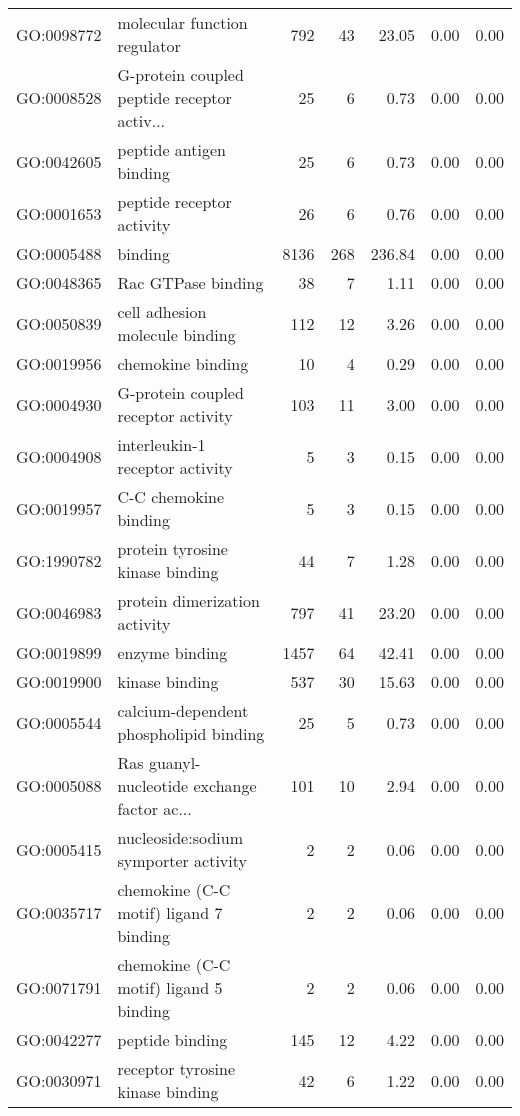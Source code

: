 \begin{table}[ht]
\begin{tabular}{llrrrrr}
  GO:0098772 & molecular function regulator & 792 &  43 & 23.05 & 0.00 & 0.00 \\ 
  GO:0008528 & G-protein coupled peptide receptor activ... &  25 &   6 & 0.73 & 0.00 & 0.00 \\ 
  GO:0042605 & peptide antigen binding &  25 &   6 & 0.73 & 0.00 & 0.00 \\ 
  GO:0001653 & peptide receptor activity &  26 &   6 & 0.76 & 0.00 & 0.00 \\ 
  GO:0005488 & binding & 8136 & 268 & 236.84 & 0.00 & 0.00 \\ 
  GO:0048365 & Rac GTPase binding &  38 &   7 & 1.11 & 0.00 & 0.00 \\ 
  GO:0050839 & cell adhesion molecule binding & 112 &  12 & 3.26 & 0.00 & 0.00 \\ 
  GO:0019956 & chemokine binding &  10 &   4 & 0.29 & 0.00 & 0.00 \\ 
  GO:0004930 & G-protein coupled receptor activity & 103 &  11 & 3.00 & 0.00 & 0.00 \\ 
  GO:0004908 & interleukin-1 receptor activity &   5 &   3 & 0.15 & 0.00 & 0.00 \\ 
  GO:0019957 & C-C chemokine binding &   5 &   3 & 0.15 & 0.00 & 0.00 \\ 
  GO:1990782 & protein tyrosine kinase binding &  44 &   7 & 1.28 & 0.00 & 0.00 \\ 
  GO:0046983 & protein dimerization activity & 797 &  41 & 23.20 & 0.00 & 0.00 \\ 
  GO:0019899 & enzyme binding & 1457 &  64 & 42.41 & 0.00 & 0.00 \\ 
  GO:0019900 & kinase binding & 537 &  30 & 15.63 & 0.00 & 0.00 \\ 
  GO:0005544 & calcium-dependent phospholipid binding &  25 &   5 & 0.73 & 0.00 & 0.00 \\ 
  GO:0005088 & Ras guanyl-nucleotide exchange factor ac... & 101 &  10 & 2.94 & 0.00 & 0.00 \\ 
  GO:0005415 & nucleoside:sodium symporter activity &   2 &   2 & 0.06 & 0.00 & 0.00 \\ 
  GO:0035717 & chemokine (C-C motif) ligand 7 binding &   2 &   2 & 0.06 & 0.00 & 0.00 \\ 
  GO:0071791 & chemokine (C-C motif) ligand 5 binding &   2 &   2 & 0.06 & 0.00 & 0.00 \\ 
  GO:0042277 & peptide binding & 145 &  12 & 4.22 & 0.00 & 0.00 \\ 
  GO:0030971 & receptor tyrosine kinase binding &  42 &   6 & 1.22 & 0.00 & 0.00 \\ 

\end{tabular}
\end{table}
